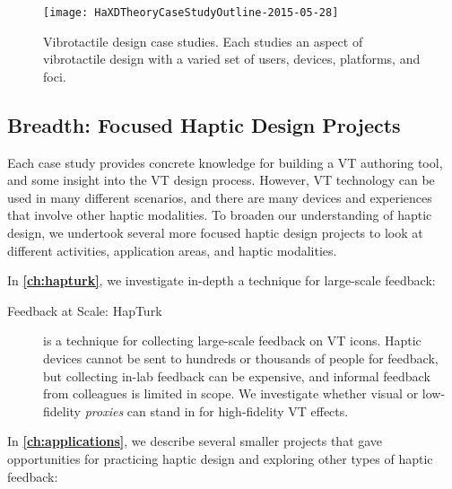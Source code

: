 \begin{figure}[htbp]
\begin{center}
\texttt{[image: HaXDTheoryCaseStudyOutline-2015-05-28]}
\caption{Vibrotactile design case studies. Each studies an aspect of vibrotactile design with a varied set of users, devices, platforms, and foci.}
\label{fig:intro:casestudyoverview}
\end{center}
\end{figure}


\subsection{Breadth: Focused Haptic Design Projects}
\label{ch:intro:approach:breadth}
Each case study provides concrete knowledge for building a VT authoring tool, and some insight into the VT design process.
However, VT technology can be used in many different scenarios, and there are many devices and experiences that involve other haptic modalities.
To broaden our understanding of haptic design, we undertook several more focused haptic design projects to look at different activities, application areas, and haptic modalities.


In \textbf{\autoref{ch:hapturk}}, we investigate in-depth a technique for large-scale feedback:

\begin{description}
	\item[Feedback at Scale: HapTurk]
	is a technique for collecting large-scale feedback on VT icons.
	Haptic devices cannot be sent to hundreds or thousands of people for feedback, but collecting in-lab feedback can be expensive, and informal feedback from colleagues is limited in scope.
	We investigate whether visual or low-fidelity \emph{proxies} can stand in for high-fidelity VT effects.
\end{description}


In \textbf{\autoref{ch:applications}}, we describe several smaller projects that gave opportunities for practicing haptic design and exploring other types of haptic feedback:

